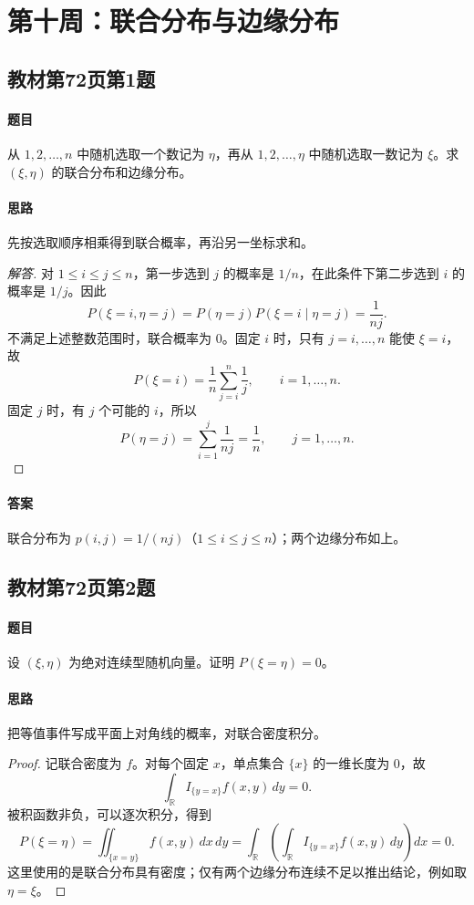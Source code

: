 \section{第十周：联合分布与边缘分布}

\subsection{教材第72页第1题}\label{ex:w10-b72-1}
\paragraph{题目}
从 $1,2,\ldots,n$ 中随机选取一个数记为 $\eta$，再从 $1,2,\ldots,\eta$ 中随机选取一数记为 $\xi$。求 $(\xi,\eta)$ 的联合分布和边缘分布。
\paragraph{思路}先按选取顺序相乘得到联合概率，再沿另一坐标求和。
\begin{proof}[解答]
对 $1\leq i\leq j\leq n$，第一步选到 $j$ 的概率是 $1/n$，在此条件下第二步选到 $i$ 的概率是 $1/j$。因此
\[
P(\xi=i,\eta=j)=P(\eta=j)P(\xi=i\mid\eta=j)=\frac1{nj}.
\]
不满足上述整数范围时，联合概率为 $0$。固定 $i$ 时，只有 $j=i,\ldots,n$ 能使 $\xi=i$，故
\[
P(\xi=i)=\frac1n\sum_{j=i}^n\frac1j,\qquad i=1,\ldots,n.
\]
固定 $j$ 时，有 $j$ 个可能的 $i$，所以
\[
P(\eta=j)=\sum_{i=1}^j\frac1{nj}=\frac1n,\qquad j=1,\ldots,n.
\]
\end{proof}
\paragraph{答案}联合分布为 $p(i,j)=1/(nj)$（$1\leq i\leq j\leq n$）；两个边缘分布如上。

\subsection{教材第72页第2题}\label{ex:w10-b72-2}
\paragraph{题目}
设 $(\xi,\eta)$ 为绝对连续型随机向量。证明 $P(\xi=\eta)=0$。
\paragraph{思路}把等值事件写成平面上对角线的概率，对联合密度积分。
\begin{proof}
记联合密度为 $f$。对每个固定 $x$，单点集合 $\{x\}$ 的一维长度为 $0$，故
\[
\int_{\mathbb R}I_{\{y=x\}}f(x,y)\,dy=0.
\]
被积函数非负，可以逐次积分，得到
\[
P(\xi=\eta)=\iint_{\{x=y\}}f(x,y)\,dx\,dy
=\int_{\mathbb R}\left(\int_{\mathbb R}I_{\{y=x\}}f(x,y)\,dy\right)dx=0.
\]
这里使用的是联合分布具有密度；仅有两个边缘分布连续不足以推出结论，例如取 $\eta=\xi$。
\end{proof}
